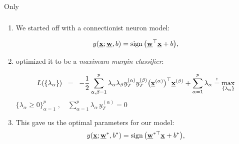 \begin{frame}{Only}\frametitle{\subsecname}

\begin{enumerate}
\item<only@1> We started off with a connectionist neuron model:

\begin{equation}
y(\underline{\mathbf{x}}; \underline{\mathbf{w}}, b) = 
			\operatorname{sign} \big( \underline{\mathbf{w}}^\top \underline{\mathbf{x}} + b \big),
\end{equation}

\item<only@1> optimized it to be a \emph{maximum margin classifier}:

			\begin{equation} 
				L(\{\lambda_\alpha\})
					\;\;=\;\;  -\frac{1}{2} \sum\limits_{\alpha, \beta = 1}^p 
					\lambda_\alpha \lambda_\beta y_T^{(\alpha)}
					y_T^{(\beta)} 
					\big( \underline{\mathbf{x}}^{(\alpha)} \big)^\top 
						\underline{\mathbf{x}}^{(\beta)}
					+ \sum\limits_{\alpha = 1}^p \lambda_\alpha{}
                    \stackrel{\mathrm{!}}{=} \max_{\{\lambda_\alpha\}}
			\end{equation}	
			$\{\lambda_\alpha \geq 0 \}_{\alpha=1}^p\;,\quad 
			\sum_{\alpha=1}^p \lambda_\alpha \, y_T^{(\alpha)} = 0$	
			
\item<only@2,3> This gave us the optimal parameters for our model:
\begin{equation}
y(\underline{\mathbf{x}}; \underline{\mathbf{w}}^*, b^*) = 
			\operatorname{sign} \big( \underline{\mathbf{w}}^{*\top} \underline{\mathbf{x}} + b^* \big),
\end{equation}

\end{enumerate}

\end{frame}
